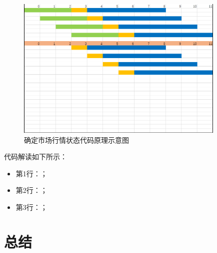 \begin{figure}[H]
    \caption{确定市场行情状态代码原理示意图}
    \label{f000005}
    \centering
    \includegraphics[width=10cm]{images/f000005}
\end{figure}
代码解读如下所示：
\begin{itemize}
    \item 第1行：；
    \item 第2行：；
    \item 第3行：；
\end{itemize}

\section{总结}